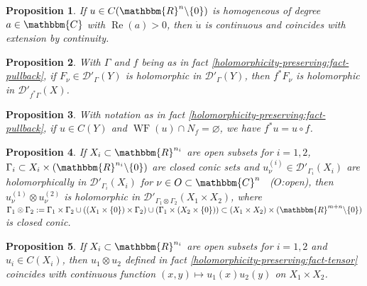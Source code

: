 \documentclass{article}
\newcommand{\assign}{:=}
\newcommand{\tmop}[1]{\ensuremath{\operatorname{#1}}}
\newtheorem{proposition}{Proposition}[section]
\theoremstyle{remark}
\begin{document}
\begin{proposition}
  \label{holomorphicity-preserving:prop-homog-cts}If $u \in C (\mathbbm{R}^n
  \backslash \{ 0 \})$ is homogeneous of degree $a \in \mathbbm{C}$ with
  $\tmop{Re} (a) > 0$, then $\dot{u}$ is continuous and coincides with
  extension by continuity.
\end{proposition}

\begin{proposition}
  \label{holomorphicity-preserving:prop-pullback-holo}With $\Gamma$ and $f$
  being as in fact \ref{holomorphicity-preserving:fact-pullback}, if $F_{\nu}
  \in \mathcal{D}'_{\Gamma} (Y)$ is holomorphic in $\mathcal{D}'_{\Gamma}
  (Y)$, then $f^{\ast} F_{\nu}$ is holomorphic in $\mathcal{D}'_{f^{\ast}
  \Gamma} (X)$.
\end{proposition}

\begin{proposition}
  \label{holomorphicity-preserving:prop-pullback-cts}With notation as in fact
  \ref{holomorphicity-preserving:fact-pullback}, if $u \in C (Y)$ and
  $\tmop{WF} (u) \cap N_f = \varnothing$, we have $f^{\ast} u = u \circ f$.
\end{proposition}

\begin{proposition}
  \label{holomorphicity-preserving:prop-tensor-holo}If $X_i \subset
  \mathbbm{R}^{n_i}$ are open subsets for $i = 1, 2$, $\Gamma_i \subset X_i
  \times (\mathbbm{R}^{n_i} \backslash \{ 0 \})$ are closed conic sets and
  $u^{(i)}_{\nu} \in \mathcal{D}\prime_{{\Gamma}_i} (X_i)$ are holomorphically in
  $\mathcal{D}'_{\Gamma_i} (X_i)$ for $\nu \in O \subset \mathbbm{C}^n$ \
  ($O$:open), then $u_{\nu}^{(1)} \otimes u^{(2)}_{\nu}$ is holomorphic in
  $\mathcal{D}'_{\Gamma_1 \otimes \Gamma_2} (X_1 \times X_2)$, where $\Gamma_1
  \otimes \Gamma_2 \assign \Gamma_1 \times \Gamma_2 \cup ((X_1 \times \{ 0 \})
  \times \Gamma_2) \cup (\Gamma_1 \times (X_2 \times \{ 0 \})) \subset (X_1
  \times X_2) \times (\mathbbm{R}^{m + n} \backslash \{ 0 \})$ is closed
  conic.
\end{proposition}

\begin{proposition}
  \label{holomorphicity-preserving:prop-tensor-cts}If $X_i \subset
  \mathbbm{R}^{n_i}$ are open subsets for $i = 1, 2$ and $u_i \in C (X_i)$,
  then $u_1 \otimes u_2$ defined in fact
  \ref{holomorphicity-preserving:fact-tensor} coincides with continuous
  function $(x, y) \mapsto u_1 (x) u_2 (y)$ on $X_1 \times X_2$.
\end{proposition}
\end{document}
